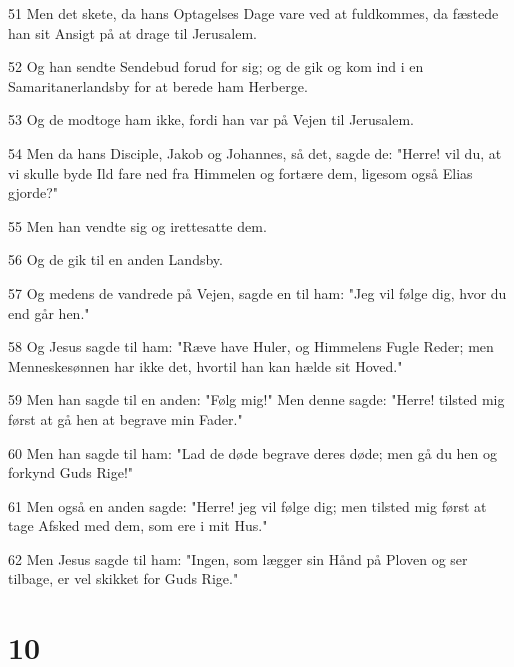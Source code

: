 \par 51 Men det skete, da hans Optagelses Dage vare ved at fuldkommes, da fæstede han sit Ansigt på at drage til Jerusalem.
\par 52 Og han sendte Sendebud forud for sig; og de gik og kom ind i en Samaritanerlandsby for at berede ham Herberge.
\par 53 Og de modtoge ham ikke, fordi han var på Vejen til Jerusalem.
\par 54 Men da hans Disciple, Jakob og Johannes, så det, sagde de: "Herre! vil du, at vi skulle byde Ild fare ned fra Himmelen og fortære dem, ligesom også Elias gjorde?"
\par 55 Men han vendte sig og irettesatte dem.
\par 56 Og de gik til en anden Landsby.
\par 57 Og medens de vandrede på Vejen, sagde en til ham: "Jeg vil følge dig, hvor du end går hen."
\par 58 Og Jesus sagde til ham: "Ræve have Huler, og Himmelens Fugle Reder; men Menneskesønnen har ikke det, hvortil han kan hælde sit Hoved."
\par 59 Men han sagde til en anden: "Følg mig!" Men denne sagde: "Herre! tilsted mig først at gå hen at begrave min Fader."
\par 60 Men han sagde til ham: "Lad de døde begrave deres døde; men gå du hen og forkynd Guds Rige!"
\par 61 Men også en anden sagde: "Herre! jeg vil følge dig; men tilsted mig først at tage Afsked med dem, som ere i mit Hus."
\par 62 Men Jesus sagde til ham: "Ingen, som lægger sin Hånd på Ploven og ser tilbage, er vel skikket for Guds Rige."

\chapter{10}


